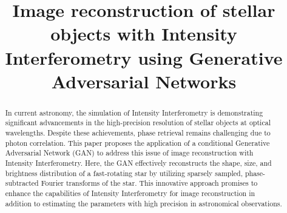 \documentclass[fleqn,usenatbib,twocolumn]{mnras}
\title{Image reconstruction of stellar objects with Intensity Interferometry using Generative Adversarial Networks}
\date{}
\begin{document}
\maketitle

\begin{abstract}
In current astronomy, the simulation of Intensity Interferometry is demonstrating significant advancements in the high-precision resolution of stellar objects at optical wavelengths. Despite these achievements, phase retrieval remains challenging due to photon correlation. This paper proposes the application of a conditional Generative Adversarial Network (GAN) to address this issue of image reconstruction with Intensity Interferometry. Here, the GAN effectively reconstructs the shape, size, and brightness distribution of a fast-rotating star by utilizing sparsely sampled, phase-subtracted Fourier transforms of the star. This innovative approach promises to enhance the capabilities of Intensity Interferometry for image reconstruction in addition to estimating the parameters with high precision in astronomical observations.
\end{abstract}









\end{document}
